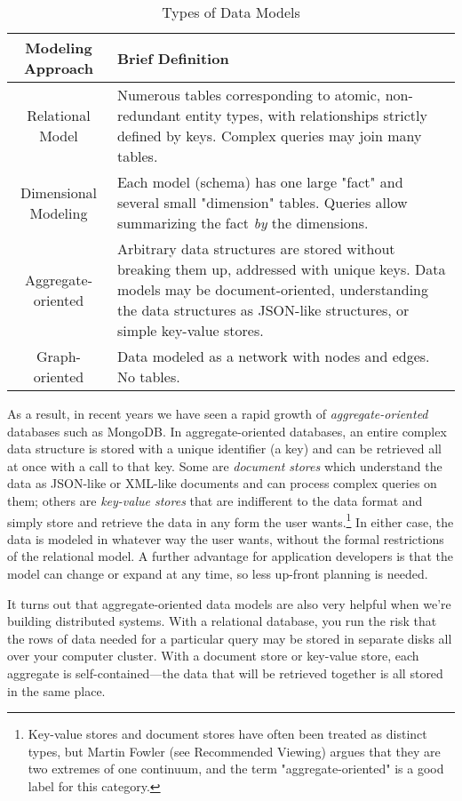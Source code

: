 \documentclass[11pt]{book}
\newcommand{\term}[1]{\emph{#1}} %
\newcommand{\head}[1]{\textnormal{\textbf{#1}}} %
\begin{document}
\begin{table}
\centering
\caption{Types of Data Models}
\vspace{10pt}
\begin{tabular}{cp{8cm}}
    \toprule[1.5pt]
    \head{Modeling Approach} & \head{Brief Definition} \\
    \midrule
    Relational Model & Numerous tables corresponding to atomic, non-redundant entity types, with relationships strictly defined by keys. Complex queries may join many tables.\\
    \midrule
    Dimensional Modeling & Each model (schema) has one large "fact" and several small "dimension" tables. Queries allow summarizing the fact \emph{by} the dimensions.\\
    \midrule
    Aggregate-oriented & Arbitrary data structures are stored without breaking them up, addressed with unique keys. Data models may be document-oriented, understanding the data structures as JSON-like structures, or simple key-value stores. \\
    \midrule
    Graph-oriented & Data modeled as a network with nodes and edges. No tables. \\
    \bottomrule[1.5pt]
\end{tabular}
\end{table}

As a result, in recent years we have seen a rapid growth of \term{aggregate-oriented} databases such as MongoDB.  In aggregate-oriented databases, an entire complex data structure is stored with a unique identifier (a key) and can be retrieved all at once with a call to that key.  Some are \term{document stores} which understand the data as JSON-like or XML-like documents and can process complex queries on them; others are \term{key-value stores} that are indifferent to the data format and simply store and retrieve the data in any form the user wants.\footnote{Key-value stores and document stores have often been treated as distinct types, but Martin Fowler (see Recommended Viewing) argues that they are two extremes of one continuum, and the term "aggregate-oriented" is a good label for this category.}  In either case, the data is modeled in whatever way the user wants, without the formal restrictions of the relational model.  A further advantage for application developers is that the model can change or expand at any time, so less up-front planning is needed.

It turns out that aggregate-oriented data models are also very helpful when we're building distributed systems.  With a relational database, you run the risk that the rows of data needed for a particular query may be stored in separate disks all over your computer cluster.  With a document store or key-value store, each aggregate is self-contained---the data that will be retrieved together is all stored in the same place.
\end{document}
